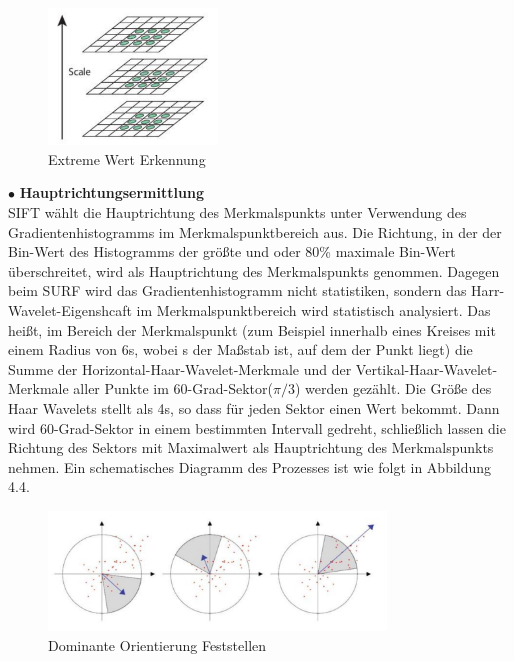 \begin{figure}[htb]
 \centering 
 \includegraphics[keepaspectratio,width=0.4\textwidth]{images/4_ZweiteErfahrung/Extreme_Wert_Erkennung.pdf}
 \caption{Extreme Wert Erkennung}
 \label{fig:Extreme Wert Erkennung}
\end{figure} 


$\bullet$ \textbf{Hauptrichtungsermittlung}\\
SIFT wählt die Hauptrichtung des Merkmalspunkts unter Verwendung des Gradientenhistogramms im Merkmalspunktbereich aus. Die Richtung, in der der Bin-Wert des Histogramms der größte und oder 80\% maximale Bin-Wert  überschreitet, wird als Hauptrichtung des Merkmalspunkts genommen. Dagegen beim SURF wird das Gradientenhistogramm nicht statistiken, sondern das Harr-Wavelet-Eigenshcaft im Merkmalspunktbereich wird statistisch analysiert. Das heißt, im Bereich der Merkmalspunkt (zum Beispiel innerhalb eines Kreises mit einem Radius von 6s, wobei s der Maßstab ist, auf dem der Punkt liegt) die Summe der Horizontal-Haar-Wavelet-Merkmale und der Vertikal-Haar-Wavelet-Merkmale aller Punkte im  60-Grad-Sektor($\pi/3$) werden gezählt. Die Größe des Haar Wavelets stellt als 4s, so dass für jeden Sektor einen Wert bekommt. Dann wird 60-Grad-Sektor in einem bestimmten Intervall gedreht, schließlich lassen die Richtung des Sektors mit Maximalwert als Hauptrichtung des Merkmalspunkts nehmen. Ein schematisches Diagramm des Prozesses ist wie folgt in Abbildung 4.4.

\begin{figure}[htb]
 \centering 
 \includegraphics[keepaspectratio,width=0.8\textwidth]{images/4_ZweiteErfahrung/Dominante_Orientierung_Feststellen.pdf}
 \caption{Dominante Orientierung Feststellen}
 \label{fig:Dominante Orientierung Feststellen}
\end{figure} 


